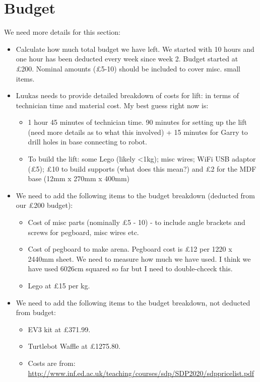 \documentclass{article}
\begin{document}
\section{Budget}
We need more details for this section:
\begin{itemize}
  \item Calculate how much total budget we have left. We started with 10 hours and one hour has been deducted every week since week 2. Budget started at \pounds 200. Nominal amounts (\pounds 5-10) should be included to cover misc. small items. 
  \item Luukas needs to provide detailed breakdown of costs for lift: in terms of technician time and material cost. My best guess right now is:
    \begin{itemize}
    \item 1 hour 45 minutes of technician time. 90 minutes for setting up the lift (need more details as to what this involved) + 15 minutes for Garry to drill holes in base connecting to robot.
    \item To build the lift: some Lego (likely <1kg); misc wires; WiFi USB adaptor (\pounds 5); \pounds 10 to build supports (what does this mean?) and \pounds 2 for the MDF base (12mm x 270mm x 400mm)
    \end{itemize}
  \item We need to add the following items to the budget breakdown (deducted from our \pounds 200 budget):
    \begin{itemize}
    \item Cost of misc parts (nominally \pounds 5 - 10) - to include angle brackets and screws for pegboard, misc wires etc. 
    \item Cost of pegboard to make arena. Pegboard cost is \pounds 12 per 1220 x 2440mm sheet. We need to measure how much we have used. I think we have used 6026cm squared so far but I need to double-chceck this. 
    \item Lego at \pounds 15 per kg. 
    \end{itemize}
  \item We need to add the following items to the budget breakdown, not deducted from budget:
    \begin{itemize}
    \item EV3 kit at \pounds 371.99.
    \item Turtlebot Waffle at \pounds 1275.80. 
    \item Costs are from: \url{http://www.inf.ed.ac.uk/teaching/courses/sdp/SDP2020/sdppricelist.pdf}
    \end{itemize}
\end{itemize}
\end{document}
